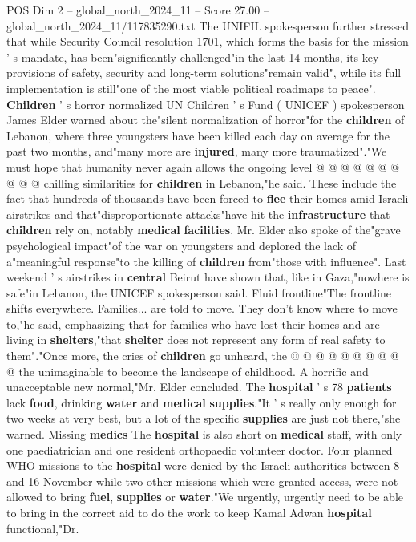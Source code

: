 \begin{textsample}{POS Dim 2 – global\_north\_2024\_11 – Score 27.00 – global\_north\_2024\_11/117835290.txt}
The UNIFIL spokesperson further stressed that while Security Council resolution 1701, which forms the basis for the mission ' s mandate, has been"significantly challenged"in the last 14 months, its key provisions of safety, security and long-term solutions"remain valid", while its full implementation is still"one of the most viable political roadmaps to peace". \textbf{Children} ' s horror normalized UN Children ' s Fund ( UNICEF ) spokesperson James Elder warned about the"silent normalization of horror"for the \textbf{children} of Lebanon, where three youngsters have been killed each day on average for the past two months, and"many more are \textbf{injured}, many more traumatized"."We must hope that humanity never again allows the ongoing level @ @ @ @ @ @ @ @ @ @ chilling similarities for \textbf{children} in Lebanon,"he said.
These include the fact that hundreds of thousands have been forced to \textbf{flee} their homes amid Israeli airstrikes and that"disproportionate attacks"have hit the \textbf{infrastructure} that \textbf{children} rely on, notably \textbf{medical} \textbf{facilities}.
Mr.
Elder also spoke of the"grave psychological impact"of the war on youngsters and deplored the lack of a"meaningful response"to the killing of \textbf{children} from"those with influence".
Last weekend ' s airstrikes in \textbf{central} Beirut have shown that, like in Gaza,"nowhere is safe"in Lebanon, the UNICEF spokesperson said.
Fluid frontline"The frontline shifts everywhere.
Families... are told to move.
They don't know where to move to,"he said, emphasizing that for families who have lost their homes and are living in \textbf{shelters},"that \textbf{shelter} does not represent any form of real safety to them"."Once more, the cries of \textbf{children} go unheard, the @ @ @ @ @ @ @ @ @ @ the unimaginable to become the landscape of childhood.
A horrific and unacceptable new normal,"Mr.
Elder concluded.
The \textbf{hospital} ' s 78 \textbf{patients} lack \textbf{food}, drinking \textbf{water} and \textbf{medical} \textbf{supplies}."It ' s really only enough for two weeks at very best, but a lot of the specific \textbf{supplies} are just not there,"she warned.
Missing \textbf{medics} The \textbf{hospital} is also short on \textbf{medical} staff, with only one paediatrician and one resident orthopaedic volunteer doctor.
Four planned WHO missions to the \textbf{hospital} were denied by the Israeli authorities between 8 and 16 November while two other missions which were granted access, were not allowed to bring \textbf{fuel}, \textbf{supplies} or \textbf{water}."We urgently, urgently need to be able to bring in the correct aid to do the work to keep Kamal Adwan \textbf{hospital} functional,"Dr.

\end{textsample}
